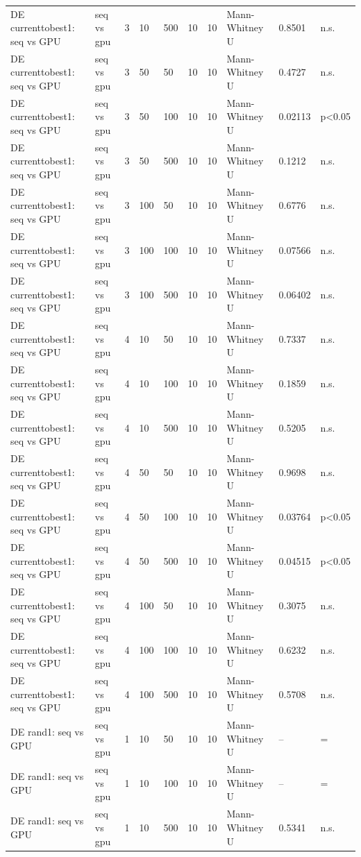 \begin{table}[t]
\begin{tabular}{llllllllll}
DE currenttobest1: seq vs GPU & seq vs gpu & 3 & 10 & 500 & 10 & 10 & Mann-Whitney U & 0.8501 & n.s. \\
DE currenttobest1: seq vs GPU & seq vs gpu & 3 & 50 & 50 & 10 & 10 & Mann-Whitney U & 0.4727 & n.s. \\
DE currenttobest1: seq vs GPU & seq vs gpu & 3 & 50 & 100 & 10 & 10 & Mann-Whitney U & 0.02113 & p<0.05 \\
DE currenttobest1: seq vs GPU & seq vs gpu & 3 & 50 & 500 & 10 & 10 & Mann-Whitney U & 0.1212 & n.s. \\
DE currenttobest1: seq vs GPU & seq vs gpu & 3 & 100 & 50 & 10 & 10 & Mann-Whitney U & 0.6776 & n.s. \\
DE currenttobest1: seq vs GPU & seq vs gpu & 3 & 100 & 100 & 10 & 10 & Mann-Whitney U & 0.07566 & n.s. \\
DE currenttobest1: seq vs GPU & seq vs gpu & 3 & 100 & 500 & 10 & 10 & Mann-Whitney U & 0.06402 & n.s. \\
DE currenttobest1: seq vs GPU & seq vs gpu & 4 & 10 & 50 & 10 & 10 & Mann-Whitney U & 0.7337 & n.s. \\
DE currenttobest1: seq vs GPU & seq vs gpu & 4 & 10 & 100 & 10 & 10 & Mann-Whitney U & 0.1859 & n.s. \\
DE currenttobest1: seq vs GPU & seq vs gpu & 4 & 10 & 500 & 10 & 10 & Mann-Whitney U & 0.5205 & n.s. \\
DE currenttobest1: seq vs GPU & seq vs gpu & 4 & 50 & 50 & 10 & 10 & Mann-Whitney U & 0.9698 & n.s. \\
DE currenttobest1: seq vs GPU & seq vs gpu & 4 & 50 & 100 & 10 & 10 & Mann-Whitney U & 0.03764 & p<0.05 \\
DE currenttobest1: seq vs GPU & seq vs gpu & 4 & 50 & 500 & 10 & 10 & Mann-Whitney U & 0.04515 & p<0.05 \\
DE currenttobest1: seq vs GPU & seq vs gpu & 4 & 100 & 50 & 10 & 10 & Mann-Whitney U & 0.3075 & n.s. \\
DE currenttobest1: seq vs GPU & seq vs gpu & 4 & 100 & 100 & 10 & 10 & Mann-Whitney U & 0.6232 & n.s. \\
DE currenttobest1: seq vs GPU & seq vs gpu & 4 & 100 & 500 & 10 & 10 & Mann-Whitney U & 0.5708 & n.s. \\
DE rand1: seq vs GPU & seq vs gpu & 1 & 10 & 50 & 10 & 10 & Mann-Whitney U & -- & = \\
DE rand1: seq vs GPU & seq vs gpu & 1 & 10 & 100 & 10 & 10 & Mann-Whitney U & -- & = \\
DE rand1: seq vs GPU & seq vs gpu & 1 & 10 & 500 & 10 & 10 & Mann-Whitney U & 0.5341 & n.s. \\

\end{tabular}
\end{table}
